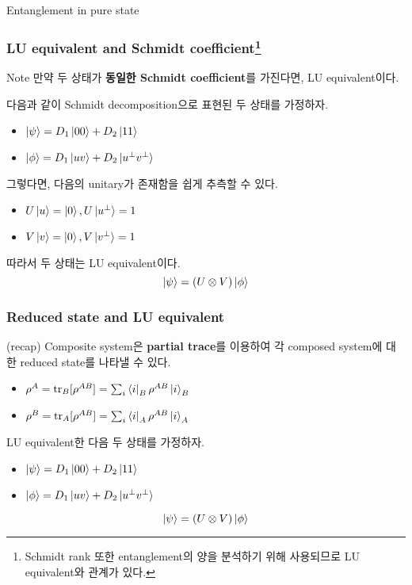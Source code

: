 \documentclass[9pt]{beamer}
\begin{document}
\begin{section}{Entanglement in pure state}
        \begin{frame}
            \frametitle{LU equivalent and Schmidt coefficient\footnote{Schmidt rank 또한 entanglement의 양을 분석하기 위해 사용되므로 LU equivalent와 관계가 있다.}}
            \begin{block}{Note}
                만약 두 상태가 \textbf{동일한 Schmidt coefficient}를 가진다면, LU equivalent이다.
            \end{block}
            \vspace{0.2cm}
            다음과 같이 Schmidt decomposition으로 표현된 두 상태를 가정하자.
            \begin{itemize}
                \item $\ket{\psi} = D_1 \ket{00} + D_2 \ket{11}$
                \item $\ket{\phi} = D_1 \ket{uv} + D_2 \ket{u^\perp v^\perp}$
            \end{itemize}
            \vspace{0.2cm}
            그렇다면, 다음의 unitary가 존재함을 쉽게 추측할 수 있다.
            \begin{itemize}
                \item $U \ket{u} = \ket 0, U\ket{u^\perp} = 1$
                \item $V \ket{v} = \ket 0, V\ket{v^\perp} = 1$
            \end{itemize}
            \vspace{0.2cm}
            따라서 두 상태는 LU equivalent이다.
            \begin{equation*}
                \ket{\psi} = (U \otimes V) \ket{\phi}
            \end{equation*}
        \end{frame}


        \begin{frame}
            \frametitle{Reduced state and LU equivalent}
            (recap) Composite system은 \textbf{partial trace}를 이용하여 각 composed system에 대한 reduced state를 나타낼 수 있다.
            \begin{itemize}
                \item $\rho^A = \text{tr}_B [\rho^{AB}] = \sum_i \bra i_B \rho^{AB} \ket i_B$
                \item $\rho^B = \text{tr}_A [\rho^{AB}] = \sum_i \bra i_A \rho^{AB} \ket i_A$
            \end{itemize}
            \vspace{0.4cm}
            LU equivalent한 다음 두 상태를 가정하자.
            \begin{itemize}
                \item $\ket{\psi} = D_1 \ket{00} + D_2 \ket{11}$
                \item $\ket{\phi} = D_1 \ket{uv} + D_2 \ket{u^\perp v^\perp}$
            \end{itemize}
            \begin{equation*}
                \ket{\psi} = (U \otimes V) \ket{\phi}
            \end{equation*}


\end{frame}
\end{section}
\end{document}
